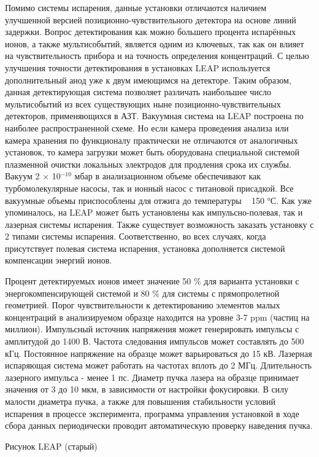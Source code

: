 Помимо системы испарения, данные установки отличаются наличием улучшенной версией позиционно-чувствительного детектора на основе линий задержки. Вопрос детектирования как можно большего процента испарённых ионов, а также мультисобытий, является одним из ключевых, так как он влияет на чувствительность прибора и на точность определения концентраций. С целью улучшения точности детектирования в установках LEAP используется дополнительный анод уже к двум имеющимся на детекторе. Таким образом, данная детектирующая система позволяет различать наибольшее число мультисобытий из всех существующих ныне позиционно-чувствительных детекторов, применяющихся в АЗТ.
Вакуумная система на LEAP построена по наиболее распространенной схеме. Но если камера проведения анализа или камера хранения по функционалу практически не отличаются от аналогичных установок, то камера загрузки может быть оборудована специальной системой плазменной очистки локальных электродов для продления срока их службы. Вакуум 2 × 10$^{-10}$ мбар в анализационном объеме обеспечивают как турбомолекулярные насосы, так и ионный насос с титановой присадкой. Все вакуумные объемы приспособлены для отжига до температуры ~ 150 °С.
Как уже упоминалось, на LEAP может быть установлены как импульсно-полевая, так и лазерная системы испарения. Также существует возможность заказать установку с 2 типами системы испарения. Соответственно, во всех случаях, когда присутствует полевая система испарения, установка дополняется системой компенсации энергий ионов.

Процент детектируемых ионов имеет значение 50 \% для варианта установки с энергокомпенсирующей системой и 80 \% для системы с прямопролетной геометрией. Порог чувствительности к детектированию элементов малых концентраций в анализируемом образце находится на уровне 3-7 ppm (частиц на миллион).
Импульсный источник напряжения может генерировать импульсы с амплитудой до 1400 В. Частота следования импульсов может составлять до 500 кГц. Постоянное напряжение на образце может варьироваться до 15 кВ. Лазерная испаряющая система может работать на частотах вплоть до 2 МГц.
Длительность лазерного импульса - менее 1 пс. Диаметр пучка лазера на образце принимает значения от 3 до 10 мкм, в зависимости от настройки фокусировки. В силу малости диаметра пучка, а также для повышения стабильности условий испарения в процессе эксперимента, программа управления установкой в ходе сбора данных периодически проводит автоматическую проверку наведения пучка.

Рисунок LEAP (старый)

